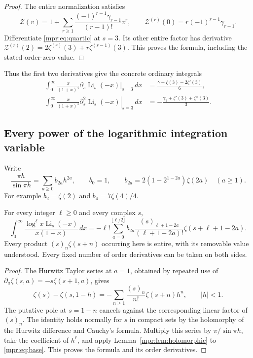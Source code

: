 \begin{proof}
The entire normalization satisfies
\[
 \mathscr Z(v)=1+\sum_{r\ge1}
                 \frac{(-1)^{r-1}\gamma_{r-1}}{(r-1)!}v^r,
 \qquad
 \mathscr Z^{(r)}(0)=r(-1)^{r-1}\gamma_{r-1}.
\]
Differentiate \eqref{mpr:eq:quartic} at $s=3$.  Its other entire factor
has derivative
$\mathscr Z^{(r)}(2)=2\zeta^{(r)}(3)+r\zeta^{(r-1)}(3)$.
This proves the formula, including the stated order-zero value.
\end{proof}

Thus the first two derivatives give the concrete ordinary integrals
\begin{align*}
 \int_0^\infty\frac{x}{(1+x)^4}
    \left.\partial_s\operatorname{Li}_s(-x)\right|_{s=3}\,dx
   &=\frac{\gamma-\zeta(3)-2\zeta'(3)}6,\\
 \int_0^\infty\frac{x}{(1+x)^4}
    \left.\partial_s^2\operatorname{Li}_s(-x)\right|_{s=3}\,dx
   &=-\frac{\gamma_1+\zeta'(3)+\zeta''(3)}3.
\end{align*}

\subsection{Every power of the logarithmic integration variable}

Write
\[
 \frac{\pi h}{\sin\pi h}=\sum_{a\ge0}b_{2a}h^{2a},\qquad
 b_0=1,\qquad b_{2a}=2(1-2^{1-2a})\zeta(2a)\quad(a\ge1).
\]
For example $b_2=\zeta(2)$ and $b_4=7\zeta(4)/4$.

\begin{theorem}\label{mpr:thm:logmoments}
For every integer $\ell\ge0$ and every complex $s$,
\begin{equation}\label{mpr:eq:logmoments}
 \boxed{\displaystyle
 \int_0^\infty
       \frac{\log^\ell x\operatorname{Li}_s(-x)}{x(1+x)}\,dx
 =-\ell!\sum_{a=0}^{\lfloor\ell/2\rfloor}
        b_{2a}\frac{(s)_{\ell+1-2a}}{(\ell+1-2a)!}
                    \zeta(s+\ell+1-2a).}
\end{equation}
Every product $(s)_n\zeta(s+n)$ occurring here is entire, with its
removable value understood.  Every fixed number of order derivatives
can be taken on both sides.
\end{theorem}

\begin{proof}
The Hurwitz Taylor series at $a=1$, obtained by repeated use of
$\partial_a\zeta(s,a)=-s\zeta(s+1,a)$, gives
\[
 \zeta(s)-\zeta(s,1-h)
    =-\sum_{n\ge1}\frac{(s)_n}{n!}\zeta(s+n)h^n,
       \qquad |h|<1.
\]
The putative pole at $s=1-n$ cancels against the corresponding linear
factor of $(s)_n$.  The identity holds normally for $s$ in compact sets
by the holomorphy of the Hurwitz difference and Cauchy's formula.
Multiply this series by $\pi/\sin\pi h$, take the coefficient of
$h^\ell$, and apply Lemma~\ref{mpr:lem:holomorphic} to
\eqref{mpr:eq:base}.  This proves the formula and its order derivatives.
\end{proof}

